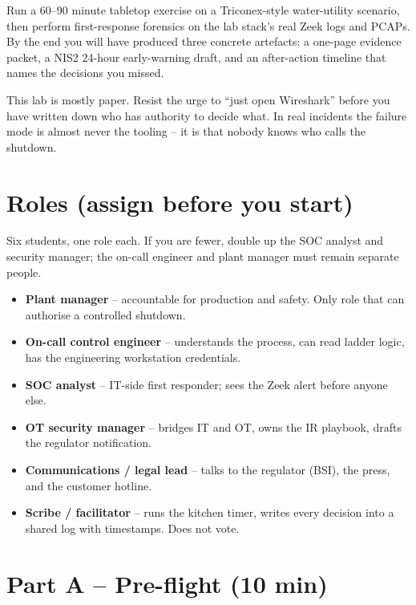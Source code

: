 \documentclass[11pt,a4paper]{article}
\begin{document}
\labheader

\begin{goalbox}
Run a 60--90 minute tabletop exercise on a Triconex-style water-utility scenario, then perform first-response forensics on the lab stack's real Zeek logs and PCAPs. By the end you will have produced three concrete artefacts: a one-page evidence packet, a NIS2 24-hour early-warning draft, and an after-action timeline that names the decisions you missed.
\end{goalbox}

\begin{warnbox}
This lab is mostly paper. Resist the urge to ``just open Wireshark'' before you have written down who has authority to decide what. In real incidents the failure mode is almost never the tooling -- it is that nobody knows who calls the shutdown.
\end{warnbox}

\section*{Roles (assign before you start)}

Six students, one role each. If you are fewer, double up the SOC analyst and security manager; the on-call engineer and plant manager must remain separate people.

\begin{itemize}\setlength{\itemsep}{1pt}
  \item \textbf{Plant manager} -- accountable for production and safety. Only role that can authorise a controlled shutdown.
  \item \textbf{On-call control engineer} -- understands the process, can read ladder logic, has the engineering workstation credentials.
  \item \textbf{SOC analyst} -- IT-side first responder; sees the Zeek alert before anyone else.
  \item \textbf{OT security manager} -- bridges IT and OT, owns the IR playbook, drafts the regulator notification.
  \item \textbf{Communications / legal lead} -- talks to the regulator (BSI), the press, and the customer hotline.
  \item \textbf{Scribe / facilitator} -- runs the kitchen timer, writes every decision into a shared log with timestamps. Does not vote.
\end{itemize}

\section*{Part A -- Pre-flight (10 min)}
\end{document}
